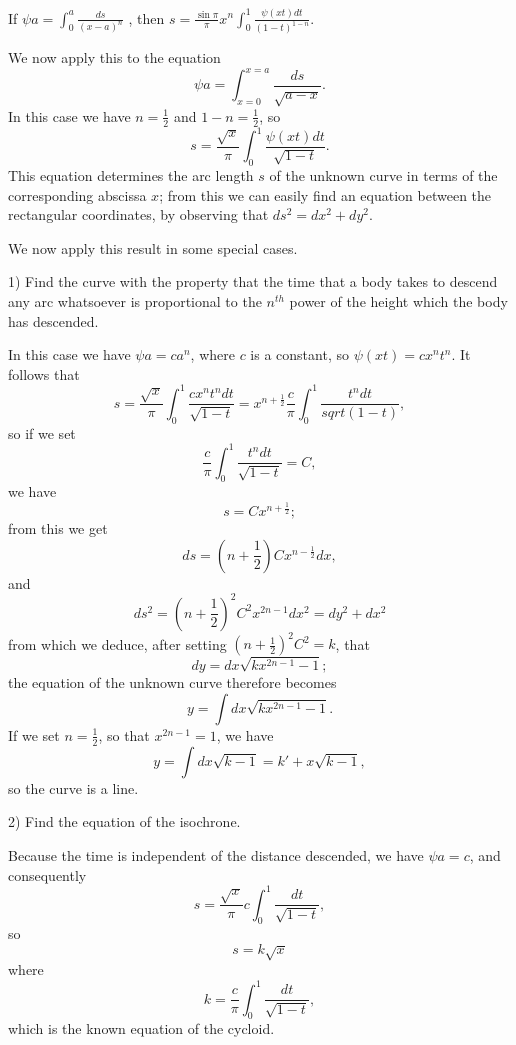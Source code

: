 \documentclass[12pt]{article}
\begin{document}
\begin{center}If $\psi a = \int_0^a \frac{ds}{(x-a)^n}$ , then $s = \frac{\sin \pi}{\pi} x^n \int_0^1 \frac{\psi(xt) dt}{(1-t)^{1-n}}$. 
\end{center}

We now apply this to the equation 
\[ \psi a = \int_{x=0}^{x=a} \frac{ds}{\sqrt{a-x}} . \]
In this case we have $n = \frac{1}{2}$ and $1-n = \frac{1}{2}$, so
\[ s = \frac{\sqrt{x}}{\pi} \int_0^1 \frac{\psi(xt) dt}{\sqrt{1-t}} .\]
This equation determines the arc length $s$ of the unknown curve in terms of the corresponding abscissa $x$; from this we can easily find an equation between the rectangular coordinates, by observing that $ds^2 = dx^2 + dy^2 $. 

We now apply this result in some special cases.

1) Find the curve with the property that the time that a body takes to descend any arc whatsoever is proportional to the $n^{th}$ power of the height which the body has descended.

In this case we have $\psi a = ca^n$, where $c$ is a constant, so $\psi(xt) = cx^nt^n$.  It follows that 
\[ s = \frac{\sqrt{x}}{\pi} \int_0^1 \frac{cx^nt^ndt}{\sqrt{1-t}} = x^{n+\frac{1}{2}} \frac{c}{\pi} \int_0^1 \frac{t^ndt}{sqrt(1-t)} , \]
so if we set 
\[ \frac{c}{\pi} \int_0^1 \frac{t^ndt}{\sqrt{1-t}} = C, \]
we have 
\[ s = C x^{n+\frac{1}{2}}; \]
from this we get
\[ ds = \left(n+\frac{1}{2}\right) C x^{n-\frac{1}{2}} dx, \]
and 
\[ ds^2 = \left(n+\frac{1}{2}\right)^2 C^2 x^{2n-1}dx^2 = dy^2 + dx^2 \]
from which we deduce, after setting $(n+\frac{1}{2})^2C^2 = k$, that 
\[ dy = dx \sqrt{kx^{2n-1} -1} ;\]
the equation of the unknown curve therefore becomes
\[ y = \int dx \sqrt{kx^{2n-1} - 1} . \]
If we set $ n = \frac{1}{2}$, so that $x^{2n-1} = 1$, we have
\[ y = \int dx \sqrt{k-1} = k' + x \sqrt{k-1}, \]
so the curve is a line.

2) Find the equation of the isochrone.

Because the time is independent of the distance descended, we have $\psi a = c$, and consequently
\[ s = \frac{\sqrt{x}}{\pi} c \int_0^1 \frac{dt}{\sqrt{1-t} }, \]
so
\[ s = k \sqrt{x} \]
where 
\[ k = \frac{c}{\pi} \int_0^1 \frac{dt}{\sqrt{1-t}}, \] 
which is the known equation of the cycloid. 
\end{document}
